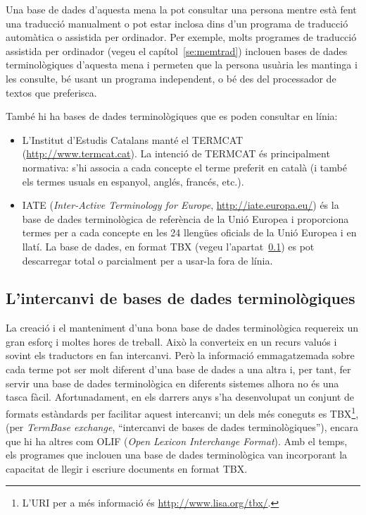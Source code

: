 Una base de dades d'aquesta mena la pot consultar una persona mentre
està fent una traducció manualment o pot estar inclosa dins d'un
programa de traducció automàtica o assistida per ordinador. Per
exemple, molts programes de traducció assistida per ordinador (vegeu
el capítol~\ref{se:memtrad}) inclouen bases de dades terminològiques
d'aquesta mena i permeten que la persona usuària les mantinga i les
consulte, bé usant un programa independent, o bé des del processador
de textos que preferisca.

També hi ha bases de dades terminològiques que es poden consultar en
línia: 
\begin{itemize}
\item L'Institut d'Estudis Catalans manté el TERMCAT
  (\url{http://www.termcat.cat}). La intenció de TERMCAT és
  principalment normativa: s'hi associa a cada concepte el terme
  preferit en català (i també els termes usuals en espanyol, anglés,
  francés, etc.).
\item IATE (\emph{Inter-Active Terminology for Europe},
  \url{http://iate.europa.eu/}) és la base de dades terminològica de
  referència de la Unió Europea i proporciona termes per a cada
  concepte en les 24 llengües oficials de la Unió Europea i en
  llatí. La base de dades, en format TBX (vegeu
  l'apartat~\ref{s3:tbx}) es pot descarregar total o parcialment per a
  usar-la fora de línia.
\end{itemize}

\subsection{L'intercanvi de bases de dades terminològiques}
\label{s3:tbx}

La creació i el manteniment d'una bona base de dades terminològica
requereix un gran esforç i moltes hores de treball. Això la converteix
en un recurs valuós i sovint els traductors en fan intercanvi. Però la
informació emmagatzemada sobre cada terme pot ser molt diferent d'una
base de dades a una altra i, per tant, fer servir una base de dades
terminològica en diferents sistemes alhora no és una tasca
fàcil. Afortunadament, en els darrers anys s'ha desenvolupat un
conjunt de formats estàndards per facilitar aquest intercanvi; un dels
més coneguts es TBX\footnote{L'URI per a més informació és
  \url{http://www.lisa.org/tbx/}.}, (per \emph{TermBase exchange},
``intercanvi de bases de dades terminològiques''), encara que hi ha
altres com OLIF (\emph{Open Lexicon Interchange Format}). Amb el
temps, els programes que inclouen una base de dades terminològica van
incorporant la capacitat de llegir i escriure documents en format TBX.

